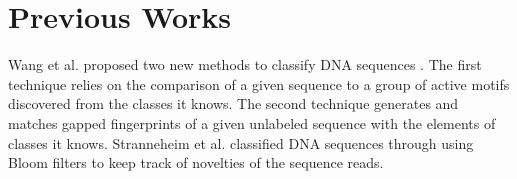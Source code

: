 \documentclass[oneside, twocolumn, a4paper, 10pt]{IEEEtran}
\begin{document}
\section{Previous Works}
Wang et al. proposed two new methods to classify DNA sequences \cite{2}. The first technique relies on the comparison of a given sequence to a group of active motifs discovered from the classes it knows. The second technique generates and matches gapped fingerprints of a given unlabeled sequence with the elements of classes it knows. Stranneheim et al. classified DNA sequences through using Bloom filters to keep track of novelties of the sequence reads\cite{3}. 
%
\end{document}
